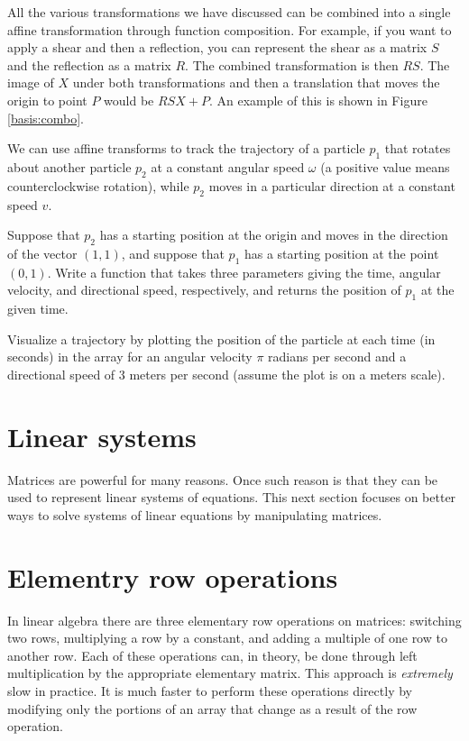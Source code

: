 All the various transformations we have discussed can be combined into a single affine transformation through function composition.
For example, if you want to apply a shear and then a reflection, you can represent the shear as a matrix $S$ and the reflection as a matrix $R$. The combined transformation is then $RS$. The image of $X$ under both transformations and then a translation that moves the origin to point $P$ would be $RSX+P$. An example of this is shown in Figure \ref{basis:combo}.

\begin{problem}
We can use affine transforms to track the trajectory of a particle $p_1$ that rotates about another particle $p_2$ at a constant angular speed $\omega$ (a positive value means counterclockwise rotation), while $p_2$ moves in a particular direction at a constant speed $v$. 

Suppose that $p_2$ has a starting position at the origin and moves in the direction of the vector $(1, 1)$, and suppose that $p_1$ has a starting position at the point $(0,1)$. Write a function that takes three parameters giving the time, angular velocity, and directional speed, respectively, and returns the position of $p_1$ at the given  time.

Visualize a trajectory by plotting the position of the particle at each time (in seconds) in the array  for an angular velocity $\pi$ radians per second and a directional speed of 3 meters per second (assume the plot is on a meters scale).
\end{problem}

\section*{Linear systems}
Matrices are powerful for many reasons. Once such reason is that they can be used to represent linear systems of equations. This next section focuses on better ways to solve systems of linear equations by manipulating matrices.

\section*{Elementry row operations}
In linear algebra there are three elementary row operations on matrices: switching two rows, multiplying a row by a constant, and adding a multiple of one row to another row. Each of these operations can, in theory, be done through left multiplication by the appropriate elementary matrix. This approach is \emph{extremely} slow in practice.
It is much faster to perform these operations directly by modifying only the portions of an array that change as a result of the row operation.


